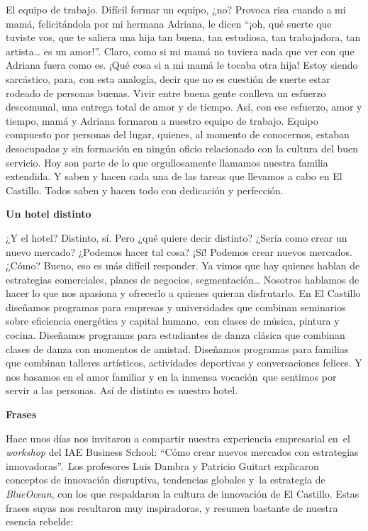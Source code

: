 El equipo de trabajo. Difícil formar un equipo, ¿no? Provoca risa cuando
a mi mamá, felicitándola por mi hermana Adriana, le dicen ``¡oh, qué
suerte que tuviste vos, que te saliera una hija tan buena, tan
estudiosa, tan trabajadora, tan artista\ldots{} es un amor!''. Claro,
como si mi mamá no tuviera nada que ver con que Adriana fuera como es.
¡Qué cosa si a mi mamá le tocaba otra hija! Estoy siendo sarcástico,
para, con esta analogía, decir que no es cuestión de suerte estar
rodeado de personas buenas. Vivir entre buena gente conlleva un esfuerzo
descomunal, una entrega total de amor y de tiempo. Así, con ese
esfuerzo, amor y tiempo, mamá y Adriana formaron a nuestro equipo de
trabajo. Equipo compuesto por personas del lugar, quienes, al momento de
conocernos, estaban desocupadas y sin formación en ningún oficio
relacionado con la cultura del buen servicio. Hoy son parte de lo que
orgullosamente llamamos nuestra familia extendida. Y saben y hacen cada
una de las tareas que llevamos a cabo en El Castillo. Todos saben y
hacen todo con dedicación y perfección.

\textbf{Un hotel distinto}

¿Y el hotel? Distinto, sí. Pero ¿qué quiere decir distinto? ¿Sería como
crear un nuevo mercado? ¿Podemos hacer tal cosa? ¡Sí! Podemos crear
nuevos mercados. ¿Cómo? Bueno, eso es más difícil responder. Ya vimos
que hay quienes hablan de estrategias comerciales, planes de negocios,
segmentación\ldots{} Nosotros hablamos de hacer lo que nos apasiona y
ofrecerlo a quienes quieran disfrutarlo. En El Castillo diseñamos
programas para empresas y universidades que combinan seminarios sobre
eficiencia energética y capital humano,~con clases de música, pintura y
cocina. Diseñamos programas para estudiantes de danza clásica que
combinan clases de danza con momentos de amistad. Diseñamos programas
para familias que combinan talleres artísticos, actividades deportivas y
conversaciones felices. Y nos basamos en el amor familiar y en la
inmensa vocación~que sentimos por servir a las personas. Así de distinto
es nuestro hotel.

\textbf{Frases}

Hace unos días nos invitaron a compartir nuestra experiencia empresarial
en~el \emph{workshop} del IAE Business School: ``Cómo crear nuevos
mercados con estrategias innovadoras''.~Los profesores Luis Dambra y
Patricio Guitart explicaron conceptos de innovación disruptiva,
tendencias globales y~la estrategia de \emph{BlueOcean}, con los que
respaldaron la cultura de innovación de El Castillo. Estas frases suyas
nos resultaron muy inspiradoras, y resumen bastante de nuestra esencia
rebelde:

